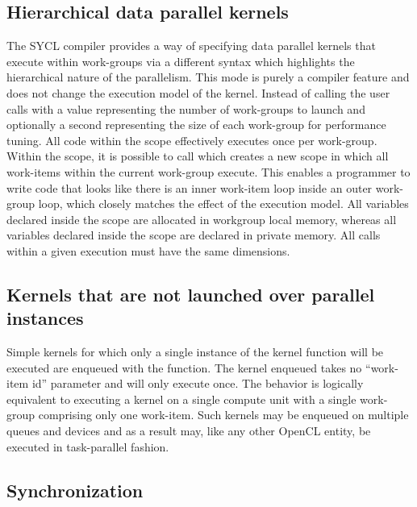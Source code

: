 \subsection{Hierarchical data parallel kernels}

The SYCL compiler provides a way of specifying data parallel kernels
that execute within work-groups via a different syntax which
highlights the hierarchical nature of the parallelism. This mode is
purely a compiler feature and does not change the execution model of
the kernel. Instead of calling  the
user calls  with a
 value representing the number of
work-groups to launch and optionally a second
 representing the size of each work-group
for performance tuning. All code within the
 scope effectively executes once
per work-group. Within the  scope,
it is possible to call  which
creates a new scope in which all work-items within the current
work-group execute. This enables a programmer to write code that looks
like there is an inner work-item loop inside an outer work-group loop,
which closely matches the effect of the execution model. All variables
declared inside the  scope are
allocated in workgroup local memory, whereas all variables declared
inside the  scope are declared in
private memory. All  calls within a
given  execution must have the
same dimensions.


\subsection{Kernels that are not launched over parallel instances}

Simple kernels for which only a single instance of the kernel function will be
executed are enqueued with the  function. The
kernel enqueued takes no ``work-item id'' parameter and will only execute once.
The behavior is logically equivalent to executing a kernel on a single compute
unit with a single work-group comprising only one work-item. Such kernels may be
enqueued on multiple queues and devices and as a result may, like any other
OpenCL entity, be executed in task-parallel fashion.

\subsection{Synchronization}
\label{sec:synchronization}


